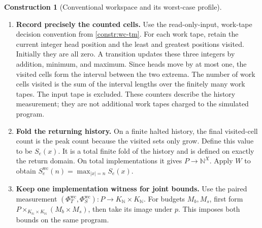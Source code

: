 \documentclass[11pt,a4paper]{article}
\numberwithin{algorithm}{section}
\numberwithin{equation}{section}
\theoremstyle{definition}
\theoremstyle{remark}
\theoremstyle{plain}
\newcommand{\N}{\mathbb N}
\theoremstyle{definition}
\newtheorem{construction}[construction]{Construction}
\theoremstyle{plain}
\begin{document}
\begin{construction}[Conventional workspace and its worst-case profile]
\label{constr:wc-space}
\leavevmode
\begin{enumerate}[leftmargin=*,align=left]
\item \textbf{Record precisely the counted cells.}
Use the read-only-input, work-tape decision convention from
\cref{constr:wc-tm}. For each work tape, retain the current integer head
position and the least and greatest positions visited. Initially they
are all zero. A transition updates these three integers by addition,
minimum, and maximum. Since heads move by at most one, the visited
cells form the interval between the two extrema. The number of work
cells visited is the sum of the interval lengths over the finitely
many work tapes. The input tape is excluded. These counters describe
the history measurement; they are not additional work tapes charged
to the simulated program.
\item \textbf{Fold the returning history.}
On a finite halted history, the final visited-cell count is the peak
count because the visited sets only grow. Define this value to be
$S_e(x)$. It is a total finite fold of the history and is defined on
exactly the return domain. On total implementations it gives
$P\to\N^X$. Apply $W$ to obtain
$S_e^{\mathrm{wc}}(n)=\max_{|x|=n}S_e(x)$.
\item \textbf{Keep one implementation witness for joint bounds.}
Use the paired measurement
$(\Phi_T^{\mathrm{wc}},\Phi_S^{\mathrm{wc}}):P\to K_\N\times K_\N$.
For budgets $M_b,M_s$, first form
$P\times_{K_\N\times K_\N}(M_b\times M_s)$, then take its
image under $p$. This imposes both bounds on the same program.
\end{enumerate}
\end{construction}
\end{document}
